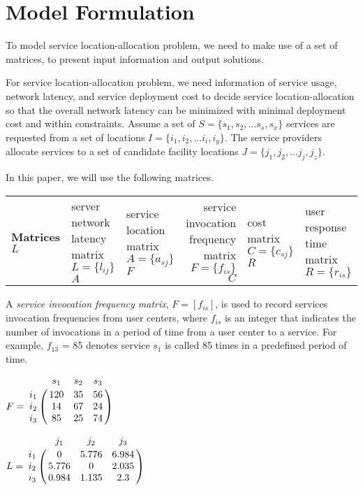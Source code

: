 \chapter{Model Formulation}\label{C:modeling}
\label{sec:model}
To model service location-allocation problem, we need to make use of a set of matrices, to present input information and output solutions. 

For service location-allocation problem, we need information of service usage, network latency, and service deployment cost to decide service location-allocation so that the overall network latency can be minimized with minimal deployment cost and within constraints.
Assume a set of $S = \{ s_{1}, s_{2}, ...s_{s}, s_{x}\}$ services are
requested from a set of locations $I = \{ i_{1}, i_{2}, ...i_{i}, i_{y} \}$. 
The service providers allocate services to a set of candidate facility locations $J = \{ j_{1}, j_{2}, ...j_{j}, j_{z} \}$.


In this paper, we will use the following matrices.
\begin{center}
{
	\begin{tabular}{l*{2}{l}r}
		\hline
		\textbf{Matrices} \cr
		$L$ & server network latency matrix $L = \{l_{ij}\}$ \cr
		$A$ & service location matrix $A = \{a_{sj}\}$ \cr
		$F$ & service invocation frequency matrix $F = \{f_{is}\}$ \cr
		$C$ & cost matrix $C = \{c_{sj}\}$ \cr
		$R$ & user response time matrix $R = \{r_{is}\}$ \cr
		\hline
	\end{tabular}
}
\end{center}
A \emph{service invocation frequency matrix}, $F= [f_{is}]$, is used to record services invocation frequencies from user centers, 
where $f_{is}$ is an integer that indicates the number of invocations in a period of time from a user center to a service. 
For example, $f_{13}$ = 85 denotes service $s_{1}$ is called 85 times in a predefined period of time.

\parbox{.45\linewidth}{
{\centering
$
F = \bbordermatrix{~ & s_{1} & s_{2} & s_{3}  \cr
					i_{1}	&120 &35 &56	\cr
					i_{2}	&14  &67 &24 \cr
					i_{3}	&85 &25 &74 \cr}
$
\\}
}
\parbox{.45\linewidth}{
{\centering
$
L = \bbordermatrix{~ & j_{1} & j_{2} & j_{3} \cr
					i_{1}	&0 &5.776 &6.984	\cr
					i_{2}	&5.776  &0 &2.035 \cr
					i_{3}	&0.984 &1.135	&2.3 \cr}
$
\\}
}

